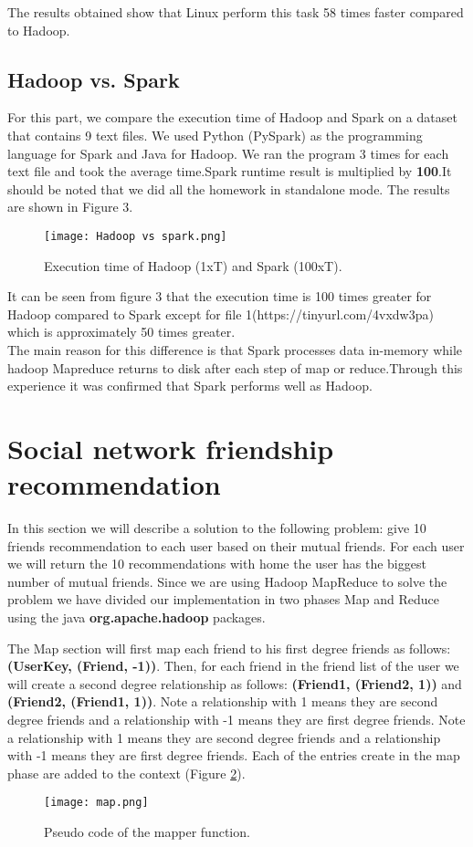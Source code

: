 \documentclass[12pt]{article}
\begin{document}
\noindent The results obtained show that Linux perform this task 58 times faster compared to Hadoop.

\subsection{Hadoop vs. Spark}
For this part, we compare the execution time of Hadoop and Spark on a dataset that contains 9 text files. We used Python (PySpark) as the programming language for Spark and Java for Hadoop. We ran the program 3 times for each text file and took the average time.Spark runtime result is multiplied by \textbf{100}.It should be noted that we did all the homework in standalone mode. The results are shown in Figure 3.

\begin{figure}[h]
  \centering
  \texttt{[image: Hadoop vs spark.png]}
  \caption{Execution time of Hadoop (1xT) and Spark (100xT).}
  \label{fig:hadoop vs spark}
\end{figure}
It can be seen from figure 3 that the execution time is 100 times greater for Hadoop compared to Spark except for file 1(https://tinyurl.com/4vxdw3pa) which is approximately 50 times greater.\\
The main reason for this difference is that Spark processes data in-memory while hadoop Mapreduce returns to disk after each step of map or reduce.Through this experience it was confirmed that Spark performs well as Hadoop.
\section{Social network friendship recommendation}
In this section we will describe a solution to the following problem:
give 10 friends recommendation to each user based on their mutual friends.
For each user we will return the 10 recommendations with home the user has the biggest number of mutual friends. Since we are using Hadoop MapReduce to solve the problem we have divided our implementation in two phases Map and Reduce using the java \textbf{org.apache.hadoop} packages.


The Map section will first map each friend to his first degree friends as follows: \textbf{(UserKey, (Friend, -1))}.
Then, for each friend in the friend list of the user we will create a second degree relationship as follows: \textbf{(Friend1, (Friend2, 1))} and \textbf{(Friend2, (Friend1, 1))}. Note a relationship with 1 means they are second degree friends and a relationship with -1 means they are first degree friends. Note a relationship with 1 means they are second degree friends and a relationship with -1 means they are first degree friends. Each of the entries create in the map phase are added to the context (Figure \ref{fig:map}).
\begin{figure}[h]
  \centering
  \texttt{[image: map.png]}
  \caption{Pseudo code of the mapper function.}
  \label{fig:map}
\end{figure}
\end{document}
